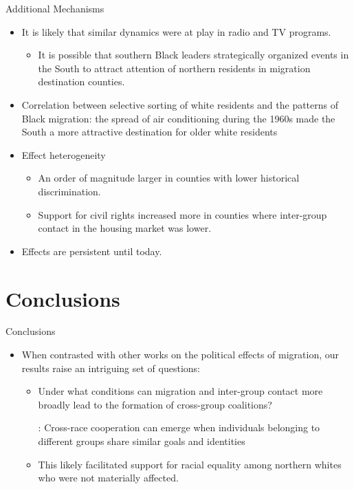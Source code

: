 \documentclass[dvipdfmx,11pt]{beamer}
\begin{document}
\begin{frame}{Additional Mechanisms}
  \begin{itemize}
    \item It is likely that similar dynamics were at play in radio and TV programs.
    \begin{itemize}
      \item It is possible that southern Black leaders strategically organized events in the South to attract attention of northern residents in migration destination counties.
    \end{itemize}
    \item Correlation between selective sorting of white residents and the patterns of Black migration: the spread of air conditioning during the 1960s made the South a more attractive destination for older white residents
    \item Effect heterogeneity
    \begin{itemize}
      \item An order of magnitude larger in counties with lower historical discrimination.
      \item Support for civil rights increased more in counties where inter-group contact in the housing market was lower.
    \end{itemize}
    \item Effects are persistent until today.
  \end{itemize}
\end{frame}

\section{Conclusions}
\frame{\sectionpage}

\begin{frame}{Conclusions}
  \begin{itemize}
    \item When contrasted with other works on the political effects of migration, our results raise an intriguing set of questions:
    \begin{itemize}
      \item Under what conditions can migration and inter-group contact more broadly lead to the formation of cross-group coalitions?
      
      : Cross-race cooperation can emerge when
      individuals belonging to different groups share similar goals and identities
      \item This likely facilitated support for racial equality among northern whites who were not materially affected.
    \end{itemize}
  \end{itemize}
\end{frame}
\end{document}
